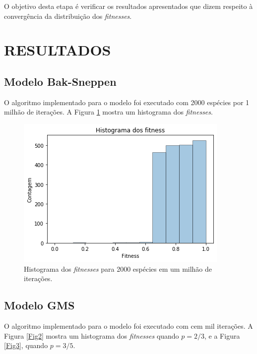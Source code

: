\documentclass[10pt,brazil,english]{article}
\begin{document}
        O objetivo desta etapa é verificar os resultados apresentados que dizem respeito à convergência da distribuição dos \textit{fitnesses}.

    \section{\uppercase{Resultados}}

        \subsection{Modelo Bak-Sneppen}

            O algoritmo implementado para o modelo foi executado com 2000 espécies por 1 milhão de iterações.
            A Figura \ref{Fig1} mostra um histograma dos \textit{fitnesses}.

            \begin{figure}[!hbtp]
                \begin{center}
                    \includegraphics[scale=0.5]{Images/5-1.png}
                \end{center}
                \caption{Histograma dos \textit{fitnesses} para 2000 espécies em um milhão de iterações.}
                \label{Fig1}
            \end{figure}

        \subsection{Modelo GMS}

            O algoritmo implementado para o modelo foi executado com cem mil iterações.
            A Figura \ref{Fig2} mostra um histograma dos \textit{fitnesses} quando $p = 2/3$, e a Figura \ref{Fig3}, quando $p = 3/5$.
\end{document}
